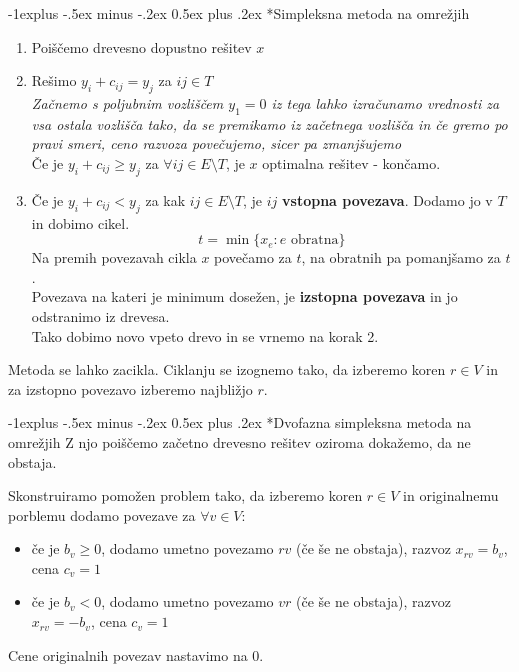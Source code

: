 \documentclass[a4paper,8pt]{extarticle}
\makeatletter
\renewcommand{\subsection}{\@startsection{subsection}{2}{0mm}%
                                {-1explus -.5ex minus -.2ex}%
                                {0.5ex plus .2ex}%
                                {\normalfont\normalsize\bfseries}}
\makeatother
\begin{document}
\begin{multicols}{4}
\subsection*{Simpleksna metoda na omrežjih}
\begin{enumerate}
	\item Poiščemo drevesno dopustno rešitev $x$
	\item Rešimo $y_i + c_{ij} = y_j$ za $ij \in T$ \\
	\emph{Začnemo s poljubnim vozliščem $y_1 = 0$ iz tega lahko izračunamo vrednosti za vsa ostala vozlišča tako, da se premikamo iz začetnega vozlišča in če gremo po pravi smeri, ceno razvoza povečujemo, sicer pa zmanjšujemo} \\
	Če je $y_i + c_{ij} \geq y_j$ za $\forall ij \in E \setminus T$, je $x$ optimalna rešitev - končamo.
	\item Če je $y_i + c_{ij} < y_j$ za kak $ij \in E \setminus T$, je $ij$ \textbf{vstopna povezava}. Dodamo jo v $T$ in dobimo cikel.
	\[ t = \min \{x_e : e \text{ obratna}\}\]
	Na premih povezavah cikla $x$ povečamo za $t$, na obratnih pa pomanjšamo za $t$.\\
	Povezava na kateri je minimum dosežen, je \textbf{izstopna povezava} in jo odstranimo iz drevesa. \\
	Tako dobimo novo vpeto drevo in se vrnemo na korak 2.
\end{enumerate}

Metoda se lahko zacikla. Ciklanju se izognemo tako, da izberemo koren $r \in V$ in za  izstopno povezavo izberemo najbližjo $r$.

\subsection*{Dvofazna simpleksna metoda na omrežjih}
Z njo poiščemo začetno drevesno rešitev oziroma dokažemo, da ne obstaja.

Skonstruiramo pomožen problem tako, da izberemo koren $r \in V$ in originalnemu porblemu dodamo povezave za $\forall v \in V$:
\begin{itemize}
	\item če je $b_v \geq 0$, dodamo umetno povezamo $rv$ (če še ne obstaja), razvoz $x_{rv} = b_v$, cena $c_v = 1$
	\item če je $b_v < 0$, dodamo umetno povezamo $vr$ (če še ne obstaja),  razvoz $x_{rv} = -b_v$, cena $c_v = 1$
\end{itemize}
Cene originalnih povezav nastavimo na 0.


\end{multicols}
\end{document}
